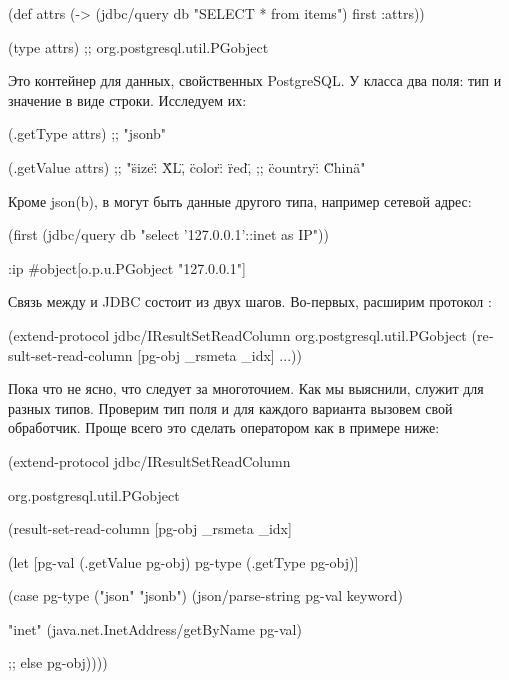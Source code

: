 \begin{english}
  \begin{clojure}
(def attrs
  (-> (jdbc/query db "SELECT * from items")
      first
      :attrs))

(type attrs)
;; org.postgresql.util.PGobject
  \end{clojure}
\end{english}

Это контейнер для данных, свойственных PostgreSQL. У класса два поля: тип и значение в виде строки. Исследуем их:

\begin{english}
  \begin{clojure}
(.getType attrs)
;; "jsonb"

(.getValue attrs)
;; "{\"size\": \"XL\", \"color\": \"red\",
;;   \"country\": \"China\"}"
  \end{clojure}
\end{english}

Кроме json(b), в  могут быть данные другого типа, например сетевой адрес:

\begin{english}
  \begin{clojure}
(first (jdbc/query db "select '127.0.0.1'::inet as IP"))

{:ip #object[o.p.u.PGobject "127.0.0.1"]}
  \end{clojure}
\end{english}

Связь между  и JDBC состоит из двух шагов. Во-первых, расширим протокол :

\begin{english}
  \begin{clojure}
(extend-protocol jdbc/IResultSetReadColumn
  org.postgresql.util.PGobject
  (result-set-read-column [pg-obj _rsmeta _idx]
    ...))
  \end{clojure}
\end{english}

Пока что не ясно, что следует за многоточием. Как мы выяснили,  служит для разных типов. Проверим тип поля и для каждого варианта вызовем свой обработчик. Проще всего это сделать оператором  как в примере ниже:

\begin{english}
  \begin{clojure/lines}
(extend-protocol jdbc/IResultSetReadColumn

  org.postgresql.util.PGobject

  (result-set-read-column
    [pg-obj _rsmeta _idx]

    (let [pg-val (.getValue pg-obj)
          pg-type (.getType pg-obj)]

      (case pg-type
        ("json" "jsonb")
        (json/parse-string pg-val keyword)

        "inet"
        (java.net.InetAddress/getByName pg-val)

        ;; else
        pg-obj))))
  \end{clojure/lines}
\end{english}

